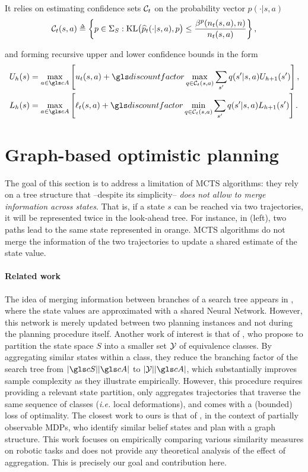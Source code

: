It relies on estimating confidence sets $\mathcal{C}_t$ on the probability vector $p(\cdot|s,a)$
$$\cC_t(s,a) \eqdef \left\{p\in \Sigma_S :  \KL\!\big(\hp_t(\cdot|s,a),p\big) \leq \frac {\beta^p(n_t(s,a), n)} {n_t(s,a)}\right\},$$

and forming recursive upper and lower confidence bounds in the form
\begin{align*}
U_{h}(s) &= \max_{a\in \cA} \left[u_t(s,a) + \discount \max_{q \in \cC_t(s,a)} \sum_{s'} q(s'|s,a) U_{h+1}(s')\right], \\
L_{h}(s) &= \max_{a\in \cA} \left[\ell_t(s,a) + \discount \min_{q \in \cC_t(s,a)} \sum_{s'} q(s'|s,a)L_{h+1}(s')\right].
\end{align*}

\section{Graph-based optimistic planning}
\label{sec:gbop}


The goal of this section is to address a limitation of \gls{MCTS} algorithms: they rely on a tree structure that  --despite its simplicity-- \emph{does not allow to merge information across states}. That is, if a state $s$ can be reached via two trajectories, it will be represented twice in the look-ahead tree. For instance, in  (left), two paths lead to the same state represented in orange. \gls{MCTS} algorithms do not merge the information of the two trajectories to update a shared estimate of the state value.

\paragraph{Related work}

The idea of merging information between branches of a search tree appears in \citep{Silver18}, where the state values are approximated with a shared Neural Network. However, this network is merely updated between two planning instances and not during the planning procedure itself.
Another work of interest is that of \citet{Hostetler14}, who propose to partition the state space $S$ into a smaller set $\mathcal{Y}$ of equivalence classes. By aggregating similar states within a class, they reduce the branching factor of the search tree from $|\cS||\cA|$ to $|\cY||\cA|$, which substantially improves sample complexity as they illustrate empirically. However, this procedure requires providing a relevant state partition, only aggregates trajectories that traverse the same sequence of classes (\emph{i.e.} local deformations), and comes with a (bounded) loss of optimality.
The closest work to ours is that of \citet{Ballesteros2013}, in the context of partially observable \glspl{MDP}, who identify similar belief states and plan with a graph structure. This work focuses on empirically comparing various similarity measures on robotic tasks and does not provide any theoretical analysis of the effect of aggregation. This is precisely our goal and contribution here.

